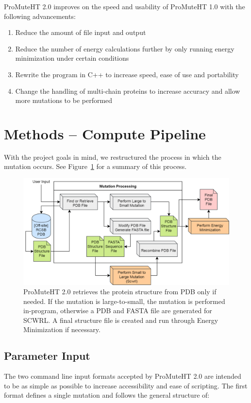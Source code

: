 \documentclass[sigconf]{acmart}
\begin{document}
ProMuteHT 2.0 improves on the speed and usability of ProMuteHT 1.0 with the following advancements:
\begin{enumerate}
\item Reduce the amount of file input and output
\item Reduce the number of energy calculations further by only running energy minimization under certain conditions
\item Rewrite the program in C++ to increase speed, ease of use and portability
\item Change the handling of multi-chain proteins to increase accuracy and allow more mutations to be performed
\end{enumerate}


\section{Methods -- Compute Pipeline}
With the project goals in mind, we restructured the process in which the mutation occurs.  See Figure~\ref{proMute2Pipeline} for a summary of this process.

\begin{figure}[b]
\includegraphics[width=0.95\columnwidth]{Figures/proMute2.png}
\caption{ProMuteHT 2.0 retrieves the protein structure from PDB only if needed.  If the mutation is large-to-small, the mutation is performed in-program, otherwise a PDB and FASTA file are generated for SCWRL.  A final structure file is created and run through Energy Minimization if necessary.}
\label{proMute2Pipeline}
\end{figure}

\subsection{Parameter Input}
The two command line input formats accepted by ProMuteHT 2.0 are intended to be as simple as possible to increase accessibility and ease of scripting.  The first format defines a single mutation and follows the general structure of:
\end{document}
